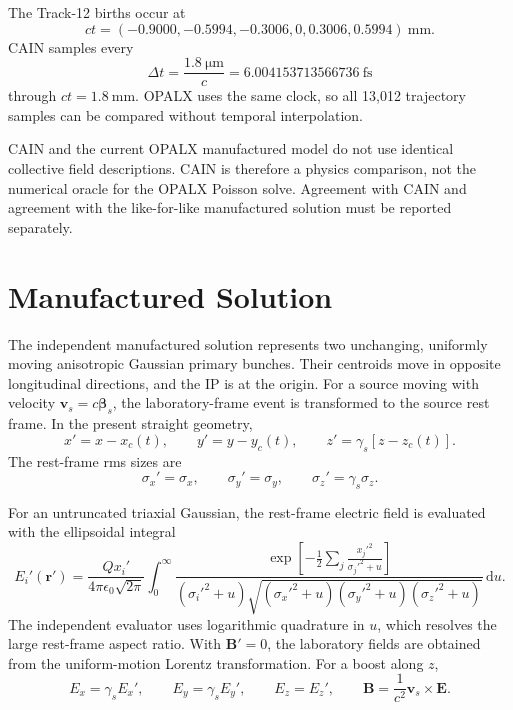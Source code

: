 \documentclass[11pt,a4paper]{article}
\newcommand{\vect}[1]{\boldsymbol{#1}}
\newcommand{\E}{\vect{E}}
\newcommand{\B}{\vect{B}}
\newcommand{\betav}{\boldsymbol{\beta}}
\newcommand{\dd}{\mathrm{d}}
\begin{document}
The Track-12 births occur at
\begin{equation}
  ct = (-0.9000,-0.5994,-0.3006,0,0.3006,0.5994)\ \si{\milli\metre}.
\end{equation}
CAIN samples every
\begin{equation}
  \Delta t = \frac{\SI{1.8}{\micro\metre}}{c}
           = \SI{6.004153713566736}{\femto\second}
\end{equation}
through $ct=\SI{1.8}{\milli\metre}$.  OPALX uses the same clock, so all 13,012
trajectory samples can be compared without temporal interpolation.

CAIN and the current OPALX manufactured model do not use identical collective
field descriptions.  CAIN is therefore a physics comparison, not the numerical
oracle for the OPALX Poisson solve.  Agreement with CAIN and agreement with the
like-for-like manufactured solution must be reported separately.

\section{Manufactured Solution}

The independent manufactured solution represents two unchanging, uniformly
moving anisotropic Gaussian primary bunches.  Their centroids move in opposite
longitudinal directions, and the IP is at the origin.  For a source moving with
velocity $\vect v_s=c\betav_s$, the laboratory-frame event is transformed to
the source rest frame.  In the present straight geometry,
\begin{equation}
  x'=x-x_c(t),\qquad
  y'=y-y_c(t),\qquad
  z'=\gamma_s[z-z_c(t)].
\end{equation}
The rest-frame rms sizes are
\begin{equation}
  \sigma_x'=\sigma_x,\qquad
  \sigma_y'=\sigma_y,\qquad
  \sigma_z'=\gamma_s\sigma_z.
\end{equation}

For an untruncated triaxial Gaussian, the rest-frame electric field is evaluated
with the ellipsoidal integral
\begin{equation}
 E_i'(\vect r') =
 \frac{Qx_i'}{4\pi\epsilon_0\sqrt{2\pi}}
 \int_0^\infty
 \frac{\exp\!\left[-\frac{1}{2}\sum_j
       \frac{x_j'^2}{\sigma_j'^2+u}\right]}
 {(\sigma_i'^2+u)
  \sqrt{(\sigma_x'^2+u)(\sigma_y'^2+u)(\sigma_z'^2+u)}}\,\dd u .
\end{equation}
The independent evaluator uses logarithmic quadrature in $u$, which resolves
the large rest-frame aspect ratio.  With $\B'=0$, the laboratory fields are
obtained from the uniform-motion Lorentz transformation.  For a boost along
$z$,
\begin{equation}
  E_x=\gamma_s E_x',\qquad E_y=\gamma_s E_y',\qquad E_z=E_z',
  \qquad
  \B=\frac{1}{c^2}\vect v_s\times\E.
\end{equation}
\end{document}
